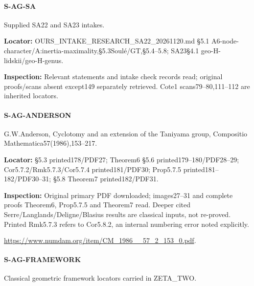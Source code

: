 \documentclass[11pt,a4paper]{article}
\begin{document}
\paragraph{S-AG-SA} Supplied SA22 and SA23 intakes.

\textbf{Locator:} OURS\_\allowbreak{}INTAKE\_\allowbreak{}RESEARCH\_\allowbreak{}SA22\_\allowbreak{}20261120.\allowbreak{}md §5.\allowbreak{}1 A6-node-character/\allowbreak{}A:\allowbreak{}inertia-maximality,§5.\allowbreak{}3Soulé/\allowbreak{}GT,§5.\allowbreak{}4–\allowbreak{}5.\allowbreak{}8; SA23§4.\allowbreak{}1 geo-H-lidskii/\allowbreak{}geo-H-genus.

\textbf{Inspection:} Relevant statements and intake check records read; original proofs/\allowbreak{}scans absent except149 separately retrieved.\allowbreak{} Cote1 scans79–\allowbreak{}80,111–\allowbreak{}112 are inherited locators.\allowbreak{}


\paragraph{S-AG-ANDERSON} G.\allowbreak{}W.\allowbreak{}Anderson, Cyclotomy and an extension of the Taniyama group, Compositio Mathematica57(1986),153–\allowbreak{}217.

\textbf{Locator:} §5.\allowbreak{}3 printed178/\allowbreak{}PDF27; Theorem6 §5.\allowbreak{}6 printed179–\allowbreak{}180/\allowbreak{}PDF28–\allowbreak{}29; Cor5.\allowbreak{}7.\allowbreak{}2/\allowbreak{}Rmk5.\allowbreak{}7.\allowbreak{}3/\allowbreak{}Cor5.\allowbreak{}7.\allowbreak{}4 printed181/\allowbreak{}PDF30; Prop5.\allowbreak{}7.\allowbreak{}5 printed181–\allowbreak{}182/\allowbreak{}PDF30–\allowbreak{}31; §5.\allowbreak{}8 Theorem7 printed182/\allowbreak{}PDF31.

\textbf{Inspection:} Original primary PDF downloaded; images27–\allowbreak{}31 and complete proofs Theorem6, Prop5.\allowbreak{}7.\allowbreak{}5 and Theorem7 read.\allowbreak{} Deeper cited Serre/\allowbreak{}Langlands/\allowbreak{}Deligne/\allowbreak{}Blasius results are classical inputs, not re-proved.\allowbreak{} Printed Rmk5.\allowbreak{}7.\allowbreak{}3 refers to Cor5.\allowbreak{}8.\allowbreak{}2, an internal numbering error noted explicitly.\allowbreak{}

\url{https://www.numdam.org/item/CM_1986__57_2_153_0.pdf}.

\paragraph{S-AG-FRAMEWORK} Classical geometric framework locators carried in ZETA\_\allowbreak{}TWO.
\end{document}
